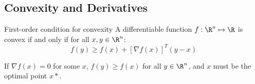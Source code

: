 \documentclass[../Main.tex]{subfiles}
\begin{document}
\subsection{Convexity and Derivatives}
\begin{theorem}{First-order condition for convexity}
    A differentiable function $f : \R^n \mapsto \R$ is convex if and only if for all $x, y \in \R^n$:
    \begin{equation}
        f(y) \geq f(x) + \left[\nabla f(x)\right]^T(y - x)
        \label{eqnFirstOrderCondition}
    \end{equation}
    \label{thmFirstOrderCondition}
\end{theorem}
\begin{remark}
    If $\nabla f(x) = 0$ for some $x$, $f(y) \geq f(x)$ for all $y \in \R^n$, and $x$ must be the optimal point $x*$.
\end{remark}
\end{document}

